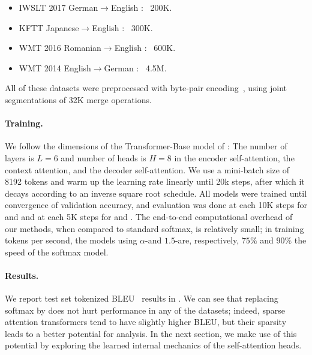 \begin{itemize}[itemsep=.5ex,leftmargin=2ex]
    \item IWSLT 2017 German$\rightarrow$English
          \citep[,][]{cettolooverview}: ~200K.
    \item KFTT Japanese$\rightarrow$English
          \citep[,][]{neubig11kftt}: ~300K.
    \item WMT 2016 Romanian$\rightarrow$English
          \citep[,][]{bojar2016findings}: ~600K.
    \item WMT 2014 English$\rightarrow$German
          \citep[,][]{bojar2014findings}: ~4.5M.
\end{itemize}

All of these datasets were preprocessed with byte-pair
encoding~\citep[BPE;][]{sennrich2016neural}, using joint
segmentations of 32K merge operations.

\paragraph*{Training.}
We follow the dimensions of the Transformer-Base model of
\citet{vaswani2017attention}: The number of layers is $L=6$ and
number of heads is $H=8$ in the encoder self-attention, the context
attention, and the decoder self-attention. We use a mini-batch size
of 8192 tokens and warm up the learning rate linearly until 20k
steps, after which it decays according to an inverse square root
schedule. All models were trained until convergence of validation
accuracy, and evaluation was done at each 10K steps for
 and  and at each 5K steps for
 and . The end-to-end computational
overhead of our methods, when compared to standard softmax, is
relatively small; in training tokens per second, the models using
$\alpha$-\entmaxtext and $1.5$-\entmaxtext are, respectively, $75\%$
and $90\%$ the speed of the softmax model.

\paragraph*{Results.}
We report test set tokenized BLEU~\citep{papineni2002bleu} results in
. We can see that replacing softmax by
\entmaxtext{} does not hurt performance in any of the datasets;
indeed, sparse attention transformers tend to have slightly higher
BLEU, but their sparsity leads to a better potential for analysis. In
the next section, we make use of this potential by exploring the
learned internal mechanics of the self-attention heads.

